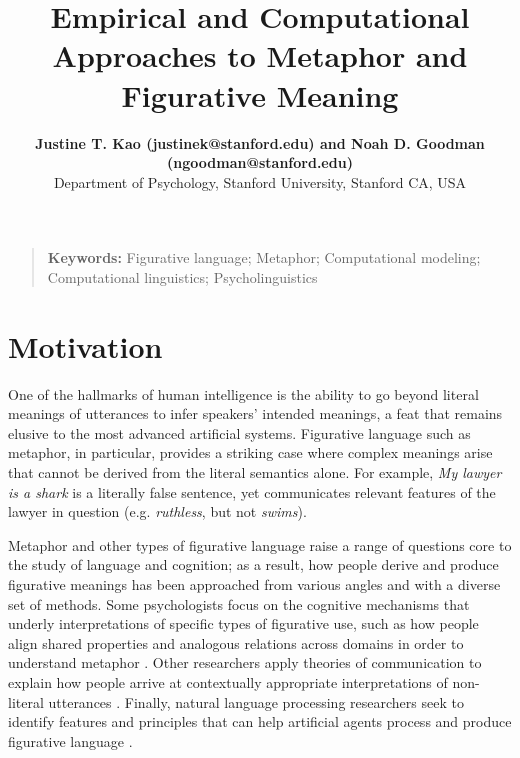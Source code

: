 \documentclass[10pt,letterpaper]{article}
\title{Empirical and Computational Approaches to Metaphor and Figurative Meaning}
\author{{\large \bf Justine T. Kao (justinek@stanford.edu) and Noah D. Goodman (ngoodman@stanford.edu)} \\ 
  Department of Psychology, 
  Stanford University, Stanford CA, USA}
\begin{document}
\maketitle

\begin{quote}
\small
\textbf{Keywords:} 
Figurative language; Metaphor; Computational modeling; Computational linguistics; Psycholinguistics
\end{quote}

\section{Motivation}
One of the hallmarks of human intelligence is the ability to go beyond literal meanings of utterances to infer speakers' intended meanings, a feat that remains elusive to the most advanced artificial systems. Figurative language such as metaphor, in particular, provides a striking case where complex meanings arise that cannot be derived from the literal semantics alone. For example, \emph{My lawyer is a shark} is a literally false sentence, yet communicates relevant features of the lawyer in question (e.g. \emph{ruthless}, but not \emph{swims}). 


Metaphor and other types of figurative language raise a range of questions core to the study of language and cognition;
as a result, how people derive and produce figurative meanings has been approached from various angles and with a diverse set of methods. Some psychologists focus on the cognitive mechanisms that underly interpretations of specific types of figurative use, such as how people align shared properties and analogous relations across domains in order to understand metaphor \cite{gentner1997alignment}. 
Other researchers apply theories of communication to explain how people arrive at contextually appropriate interpretations of non-literal utterances \cite{steen2015developing, kao2014nonliteral}. Finally, natural language processing researchers seek to identify features and principles that can help artificial agents process and produce figurative language \cite{veale2007comprehending}.
\end{document}
